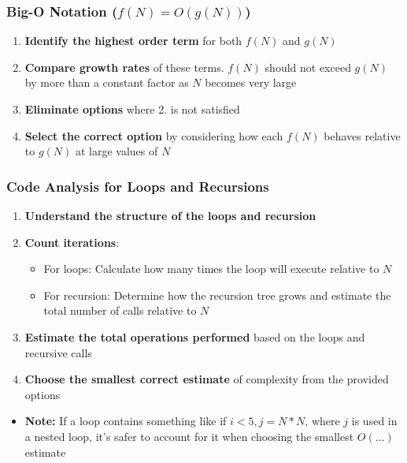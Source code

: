 \documentclass{article}
\begin{document}
\subsubsection{Big-O Notation ($f(N)=O(g(N))$)}

\begin{enumerate}
    \item \textbf{Identify the highest order term} for both $f(N)$ and $g(N)$
    \item \textbf{Compare growth rates} of these terms. $f(N)$ should not exceed $g(N)$ by more than a constant factor as $N$ becomes very large
    \item \textbf{Eliminate options} where 2. is not satisfied
    \item \textbf{Select the correct option} by considering how each $f(N)$ behaves relative to $g(N)$ at large values of $N$
\end{enumerate}

\subsubsection{Code Analysis for Loops and Recursions}

\begin{enumerate}
    \item \textbf{Understand the structure of the loops and recursion}
    \item \textbf{Count iterations}:
    \begin{itemize}
        \item For loops: Calculate how many times the loop will execute relative to $N$
        \item For recursion: Determine how the recursion tree grows and estimate the total number of calls relative to $N$
    \end{itemize}
    \item \textbf{Estimate the total operations performed} based on the loops and recursive calls
    \item \textbf{Choose the smallest correct estimate} of complexity from the provided options
\end{enumerate}

\begin{itemize}
    \item \textbf{Note:} If a loop contains something like if $i < 5, j = N * N$, where $j$ is used in a nested loop, it's safer to account for it when choosing the smallest $O(...)$ estimate 
\end{itemize}
\end{document}
